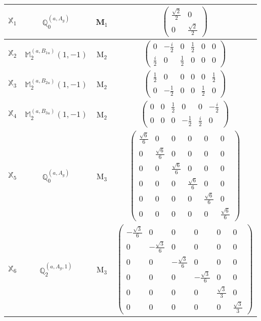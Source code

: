 \documentclass[fleqn,10pt,landscape]{article}
\begin{document}
\begin{itemize}
\begin{center}
\begin{longtable}{c|c|c|c}
$ \mathbb{X}_{1} $ & $\mathbb{Q}_{0}^{(a,A_{g})}$ & M$_{1}$ & $\begin{pmatrix} \frac{\sqrt{2}}{2} & 0 \\ 0 & \frac{\sqrt{2}}{2} \end{pmatrix}$ \\ \hline
$ \mathbb{X}_{2} $ & $\mathbb{M}_{2}^{(a,B_{1u})}(1,-1)$ & M$_{2}$ & $\begin{pmatrix} 0 & - \frac{i}{2} & 0 & \frac{1}{2} & 0 & 0 \\ \frac{i}{2} & 0 & \frac{1}{2} & 0 & 0 & 0 \end{pmatrix}$ \\
$ \mathbb{X}_{3} $ & $\mathbb{M}_{2}^{(a,B_{2u})}(1,-1)$ & M$_{2}$ & $\begin{pmatrix} \frac{1}{2} & 0 & 0 & 0 & 0 & \frac{1}{2} \\ 0 & - \frac{1}{2} & 0 & 0 & \frac{1}{2} & 0 \end{pmatrix}$ \\
$ \mathbb{X}_{4} $ & $\mathbb{M}_{2}^{(a,B_{3u})}(1,-1)$ & M$_{2}$ & $\begin{pmatrix} 0 & 0 & \frac{1}{2} & 0 & 0 & - \frac{i}{2} \\ 0 & 0 & 0 & - \frac{1}{2} & \frac{i}{2} & 0 \end{pmatrix}$ \\ \hline
$ \mathbb{X}_{5} $ & $\mathbb{Q}_{0}^{(a,A_{g})}$ & M$_{3}$ & $\begin{pmatrix} \frac{\sqrt{6}}{6} & 0 & 0 & 0 & 0 & 0 \\ 0 & \frac{\sqrt{6}}{6} & 0 & 0 & 0 & 0 \\ 0 & 0 & \frac{\sqrt{6}}{6} & 0 & 0 & 0 \\ 0 & 0 & 0 & \frac{\sqrt{6}}{6} & 0 & 0 \\ 0 & 0 & 0 & 0 & \frac{\sqrt{6}}{6} & 0 \\ 0 & 0 & 0 & 0 & 0 & \frac{\sqrt{6}}{6} \end{pmatrix}$ \\
$ \mathbb{X}_{6} $ & $\mathbb{Q}_{2}^{(a,A_{g},1)}$ & M$_{3}$ & $\begin{pmatrix} - \frac{\sqrt{3}}{6} & 0 & 0 & 0 & 0 & 0 \\ 0 & - \frac{\sqrt{3}}{6} & 0 & 0 & 0 & 0 \\ 0 & 0 & - \frac{\sqrt{3}}{6} & 0 & 0 & 0 \\ 0 & 0 & 0 & - \frac{\sqrt{3}}{6} & 0 & 0 \\ 0 & 0 & 0 & 0 & \frac{\sqrt{3}}{3} & 0 \\ 0 & 0 & 0 & 0 & 0 & \frac{\sqrt{3}}{3} \end{pmatrix}$ \\

\end{longtable}
\end{center}
\end{itemize}
\end{document}
